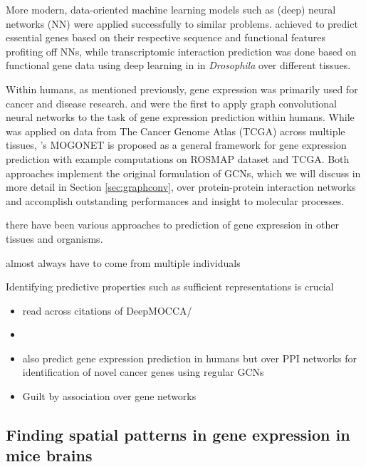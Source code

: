 \documentclass[]{article}
\renewcommand{\cite}{\citep}
\begin{document}
More modern, data-oriented machine learning models such as (deep) neural networks (NN) were applied successfully to similar problems. \citet{aromolaran2020essential} achieved to predict essential genes based on their respective sequence and functional features profiting off NNs, while transcriptomic interaction prediction was done based on functional gene data using deep learning in \citet{yang2019predicting} in \textit{Drosophila} over different tissues. 

Within humans, as mentioned previously, gene expression was primarily used for cancer and disease research. \citet{schulte2021integration} and \citet{wang2021mogonet} were the first to apply graph convolutional neural networks to the task of gene expression prediction within humans. While \citet{schulte2021integration} was applied on data from The Cancer Genome Atlas (TCGA)\cite{tomczak2015review} across multiple tissues, \citet{wang2021mogonet}'s MOGONET is proposed as a general framework for gene expression prediction with example computations on ROSMAP dataset and TCGA. Both approaches implement the original formulation of GCNs\cite{GCNConv}, which we will discuss in more detail in Section \ref{sec:graphconv}, over protein-protein interaction networks and accomplish outstanding performances and insight to molecular processes.

 there have been various approaches to prediction of gene expression in other tissues and organisms. 



almost always have to come from multiple individuals




Identifying predictive properties such as sufficient representations is crucial 

\begin{itemize}


	\item read across citations of DeepMOCCA/\citet{takata_flexible_2021}
	\item 
	\item \cite{schulte2021integration} also predict gene expression prediction in humans but over PPI networks for identification of novel cancer genes using regular GCNs
	\item Guilt by association over gene networks \cite{Oliver2000, Gillis2012}
\end{itemize}

\subsection{Finding spatial patterns in gene expression in mice brains}
\label{sec:relatedwork_micebrains}
\end{document}
